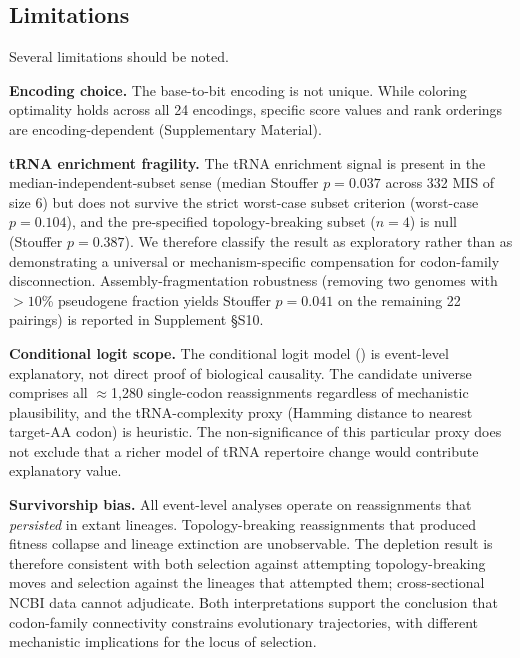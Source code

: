 \documentclass[preprint,11pt,authoryear,a4paper]{elsarticle}
\begin{document}
\subsection{Limitations}\label{sec:disc-limits}

Several limitations should be noted.

\textbf{Encoding choice.} The base-to-bit encoding is not unique. While
coloring optimality holds across all 24 encodings, specific score values
and rank orderings are encoding-dependent (Supplementary Material).

\textbf{tRNA enrichment fragility.} The tRNA enrichment signal is
present in the median-independent-subset sense (median Stouffer
\(p = 0.037\) across 332 MIS of size 6) but does not survive the strict
worst-case subset criterion (worst-case \(p = 0.104\)), and the
pre-specified topology-breaking subset (\(n = 4\)) is null (Stouffer
\(p = 0.387\)). We therefore classify the result as exploratory rather
than as demonstrating a universal or mechanism-specific compensation for
codon-family disconnection. Assembly-fragmentation robustness (removing
two genomes with \(> 10\)\% pseudogene fraction yields Stouffer
\(p = 0.041\) on the remaining 22 pairings) is reported in Supplement
§S10.

\textbf{Conditional logit scope.} The conditional logit model
() is event-level explanatory, not direct proof
of biological causality. The candidate universe comprises all
\(\approx\)1,280 single-codon reassignments regardless of mechanistic
plausibility, and the tRNA-complexity proxy (Hamming distance to nearest
target-AA codon) is heuristic. The non-significance of this particular
proxy does not exclude that a richer model of tRNA repertoire change
would contribute explanatory value.

\textbf{Survivorship bias.} All event-level analyses operate on
reassignments that \emph{persisted} in extant lineages.
Topology-breaking reassignments that produced fitness collapse and
lineage extinction are unobservable. The depletion result is therefore
consistent with both selection against attempting topology-breaking
moves and selection against the lineages that attempted them;
cross-sectional NCBI data cannot adjudicate. Both interpretations
support the conclusion that codon-family connectivity constrains
evolutionary trajectories, with different mechanistic implications for
the locus of selection.
\end{document}
